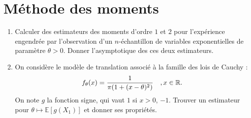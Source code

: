 \section{Méthode des moments}
\begin{enumerate}
\item Calculer des estimateurs des moments d'ordre $1$ et $2$ pour l'expérience engendrée par l'observation d'un $n$-échantillon de variables exponentielles de paramètre $\theta>0$. Donner l'asymptotique des ces deux estimateurs.
\item On considère le modèle de translation associé à la famille des lois de Cauchy :
\[f_\theta(x)=\frac{1}{\pi(1+(x-\theta)^2)}\quad, x\in\mathbb R.\]
On note $g$ la fonction signe, qui vaut $1$ si $x>0$, $-1$. Trouver un estimateur pour $\theta\mapsto \mathbb E[g(X_1)]$ et donner ses propriétés.
\end{enumerate}

